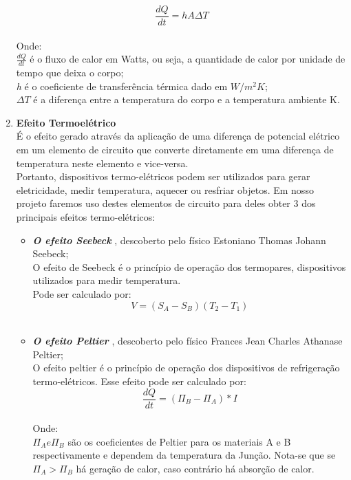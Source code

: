 \begin{enumerate}
\[\frac{dQ}{dt}= h A \Delta T\] \\

Onde:\\
$ \frac{dQ}{dt} $ é o fluxo de calor em Watts, ou seja, a quantidade de calor por unidade de tempo que deixa o corpo;\\
\emph{h} é o coeficiente de transferência térmica dado em $ W/m^{2} K $; \\
$ \Delta T $ é a diferença entre a temperatura do corpo e a temperatura ambiente K.\\
\item \textbf{Efeito Termoelétrico }\\
É o efeito gerado através da aplicação de uma diferença de potencial elétrico em um elemento de circuito que converte diretamente em uma diferença de temperatura neste elemento e vice-versa. \\
Portanto, dispositivos termo-elétricos podem ser utilizados para gerar eletricidade, medir temperatura, aquecer ou resfriar objetos.
Em nosso projeto faremos uso destes elementos de circuito para deles obter 3 dos principais efeitos termo-elétricos:

\begin{itemize}
\item \textbf{\emph{O efeito Seebeck}} \cite{huang2000system}, descoberto pelo físico Estoniano Thomas Johann Seebeck;\\
O efeito de Seebeck é o princípio de operação dos termopares, dispositivos utilizados para medir temperatura. \\
Pode ser calculado por:
\[V=\left ( S_{A}-S_{B} \right )\left ( T_{2}-T_{1} \right )\] \\

\item \textbf{\emph{O efeito Peltier}} \cite{huang2000system}, descoberto pelo físico Frances Jean Charles Athanase Peltier;\\
O efeito peltier é o princípio de operação dos dispositivos de refrigeração termo-elétricos. Esse efeito pode ser calculado por:\\
\[\frac{dQ}{dt}=\left ( \Pi_{B} -\Pi _{A} \right )\ast I\] \\

Onde:\\
$ \Pi _{A} e \Pi _{B} $ são os coeficientes de Peltier para os materiais A e B respectivamente e dependem da temperatura da Junção. Nota-se que se $ \Pi _{A} > \Pi _{B} $ há geração de calor,
caso contrário há absorção de calor.



\end{itemize}
\end{enumerate}
